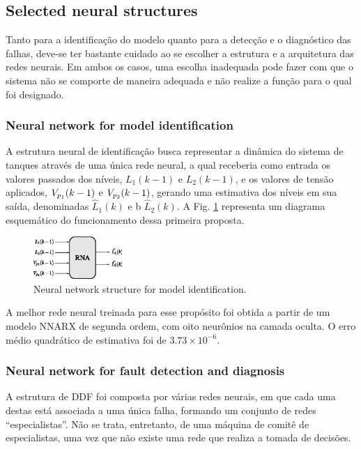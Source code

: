 \documentclass[10pt,fleqn,a4paper]{article}
\begin{document}
\subsection{Selected neural structures}
Tanto para a identificação do modelo quanto para a detecção e o diagnóstico das
falhas, deve-se ter bastante cuidado ao se escolher a estrutura e a arquitetura
das redes neurais. Em ambos os casos, uma escolha inadequada pode fazer com que
o sistema não se comporte de maneira adequada e não realize a função para o qual
foi designado.

\subsubsection{Neural network for model identification}
A estrutura neural de identificação busca representar a dinâmica do sistema de
tanques através de uma única rede neural, a qual receberia como entrada os
valores passados dos níveis, $L_1(k-1)$ e $L_2(k-1)$, e os valores de tensão
aplicados, $V_{p_{\tiny 1}}(k-1)$ e $V_{p_{\tiny 2}}(k-1)$, gerando uma
estimativa dos níveis em sua saída, denominadas $\widehat{L}_1(k)$ e b
$\widehat{L}_2(k)$. A Fig. \ref{fig:ann_id} representa um diagrama esquemático
do funcionamento dessa primeira proposta.

\begin{figure}[htb]
\centering
    \includegraphics[width=0.3\textwidth]{imgs/ann_id}
    \caption{Neural network structure for model identification.}
    \label{fig:ann_id}
\end{figure}

A melhor rede neural treinada para esse propósito foi obtida a partir de um
modelo NNARX de segunda ordem, com oito neurônios na camada oculta. O erro médio
quadrático de estimativa foi de $3.73 \times 10^{-6}$.

\subsubsection{Neural network for fault detection and diagnosis}
A estrutura de DDF foi composta por várias redes neurais, em que cada uma destas
está associada a uma única falha, formando um conjunto de redes
``especialistas''. Não se trata, entretanto, de uma máquina de comitê de
especialistas, uma vez que não existe uma rede que realiza a tomada de decisões.
\end{document}
